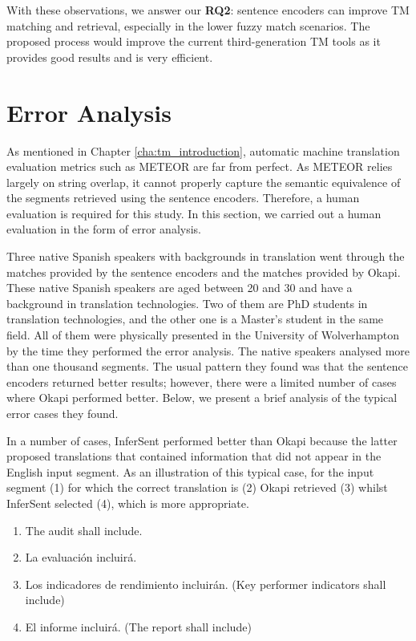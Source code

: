 With these observations, we answer our \textbf{RQ2}: sentence encoders can improve TM matching and retrieval, especially in the lower fuzzy match scenarios. The proposed process would improve the current third-generation TM tools as it provides good results and is very efficient.

\section{Error Analysis}
\label{sec:tm_sentence_encoders_error}
As mentioned in Chapter \ref{cha:tm_introduction}, automatic machine translation evaluation metrics such as METEOR are far from perfect. As METEOR relies largely on string overlap, it cannot properly capture the semantic equivalence of the segments retrieved using the sentence encoders. Therefore, a human evaluation is required for this study. In this section, we carried out a human evaluation in the form of error analysis.

Three native Spanish speakers with backgrounds in translation went through the matches provided by the sentence encoders and the matches provided by Okapi. These native Spanish speakers are aged between 20 and 30 and have a background in translation technologies. Two of them are PhD students in translation technologies, and the other one is a Master's student in the same field. All of them were physically presented in the University of Wolverhampton by the time they performed the error analysis. The native speakers analysed more than one thousand segments. The usual pattern they found was that the sentence encoders returned better results; however, there were a limited number of cases where Okapi performed better. Below, we present a brief analysis of the typical error cases they found.

In a number of cases, InferSent performed better than Okapi because the latter proposed translations that contained information that did not appear in the English input segment. As an illustration of this typical case, for the input segment (1) for which the correct translation is (2) Okapi retrieved (3) whilst InferSent selected (4), which is more appropriate. 

\begin{enumerate}[label={(\arabic*)}]
	\item The audit shall include.
	\item La evaluación incluirá.
	\item Los indicadores de rendimiento incluirán. (Key performer indicators shall include)
	\item El informe incluirá. (The report shall include)
\end{enumerate}

